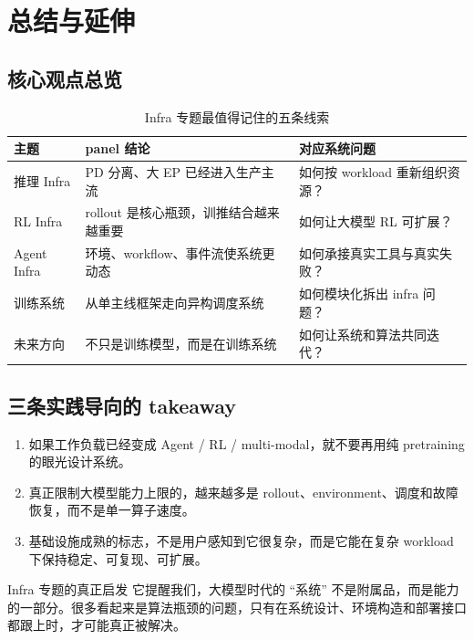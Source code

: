 \section{总结与延伸}

\subsection{核心观点总览}
\begin{table}[H]
\centering
\begin{tabular}{p{2.8cm}p{4.0cm}p{5.0cm}}
\toprule
\textbf{主题} & \textbf{panel 结论} & \textbf{对应系统问题} \\
\midrule
推理 Infra & PD 分离、大 EP 已经进入生产主流 & 如何按 workload 重新组织资源？ \\
RL Infra & rollout 是核心瓶颈，训推结合越来越重要 & 如何让大模型 RL 可扩展？ \\
Agent Infra & 环境、workflow、事件流使系统更动态 & 如何承接真实工具与真实失败？ \\
训练系统 & 从单主线框架走向异构调度系统 & 如何模块化拆出 infra 问题？ \\
未来方向 & 不只是训练模型，而是在训练系统 & 如何让系统和算法共同迭代？ \\
\bottomrule
\end{tabular}
\caption{Infra 专题最值得记住的五条线索}
\end{table}

\subsection{三条实践导向的 takeaway}
\begin{enumerate}
  \item 如果工作负载已经变成 Agent / RL / multi-modal，就不要再用纯 pretraining 的眼光设计系统。
  \item 真正限制大模型能力上限的，越来越多是 rollout、environment、调度和故障恢复，而不是单一算子速度。
  \item 基础设施成熟的标志，不是用户感知到它很复杂，而是它能在复杂 workload 下保持稳定、可复现、可扩展。
\end{enumerate}

\begin{importantbox}{Infra 专题的真正启发}
它提醒我们，大模型时代的 ``系统'' 不是附属品，而是能力的一部分。很多看起来是算法瓶颈的问题，只有在系统设计、环境构造和部署接口都跟上时，才可能真正被解决。
\end{importantbox}

